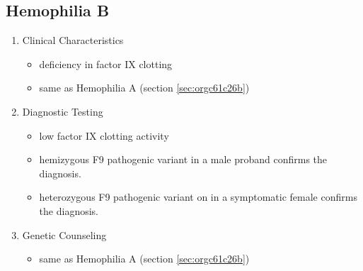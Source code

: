 \documentclass{scrartcl}
\begin{document}
\subsection{Hemophilia B}
\label{sec:orgf001302}
\begin{enumerate}
\item Clinical Characteristics
\label{sec:orgfbe54ca}
\begin{itemize}
\item deficiency in factor IX clotting
\item same as Hemophilia A (section \ref{sec:orgc61c26b})
\end{itemize}
\item Diagnostic Testing
\label{sec:orgea80c61}
\begin{itemize}
\item low factor IX clotting activity
\item hemizygous F9 pathogenic variant in a male proband confirms the
diagnosis.
\item heterozygous F9 pathogenic variant on in a symptomatic female
confirms the diagnosis.
\end{itemize}
\item Genetic Counseling
\label{sec:orga83192e}
\begin{itemize}
\item same as Hemophilia A (section \ref{sec:orgc61c26b})
\end{itemize}
\end{enumerate}
\end{document}
